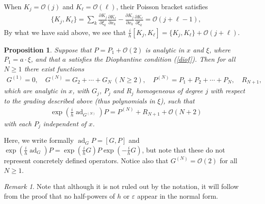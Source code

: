 \documentclass[12pt,lettersize]{article}
\renewcommand{\epsilon}{\varepsilon}
\newcommand{\poiss}[1]{\{#1\}}
\theoremstyle{plain}%
\newtheorem{prop}[theorem]{Proposition}
\numberwithin{theorem}{section}
\numberwithin{equation}{section}
\theoremstyle{definition}
\theoremstyle{remark}
\newtheorem{remark}[theorem]{Remark}
\DeclareMathOperator{\aad}{ad}
\begin{document}
{When $K_j = \mathcal{O}(j)$ and $K_\ell = \mathcal{O}(\ell)$, their Poisson bracket satisfies
%
\begin{align*}{}
\poiss{K_j,K_\ell} = \sum_{k} \frac{\partial K_j}{\partial \xi_k} \frac{\partial K_\ell}{\partial x_k}  - \frac{\partial K_j}{\partial x_k}\frac{\partial K_\ell}{\partial \xi_k} = \mathcal{O}(j + \ell - 1),
\end{align*}
%
By what we have said above, we see that $\frac{i}{h}[K_j,K_\ell] = \poiss{K_j,K_\ell} + \mathcal{O}(j + \ell)$. 


\begin{prop}\label{BNF}
Suppose  that $P = P_1 + \mathcal{O}(2)$ is analytic in $x$ and $\xi$, where $P_1 = a\cdot \xi$, and that $a$ satisfies the Diophantine condition (\ref{diof}). Then for all $N \geq 1$ there exist functions
%
\begin{align*}{}
G^{(1)} = 0,\quad G^{(N)} = G_2 + \cdots + G_N \ (N \geq 2), \quad P^{(N)} = P_1 + P_2 + \cdots + P_N, \quad  R_{N+1},
\end{align*}
%
which are analytic in $x$, with $G_j$, $P_j$ and $R_j$ homogeneous of degree $j$ with respect to the grading described above (thus polynomials in $\xi$), such that
%
\begin{align}\label{nth}
\textstyle  \exp\left( \frac{i}{h}\aad_{G^{(N)}}\right)P = P^{(N)} + R_{N+1} + \mathcal{O}(N+2)
\end{align}
%
with each $P_j$ independent of $x$. 
\end{prop}

Here, we write formally $\aad_G P = [G,P]$ and $\exp(\frac{i}{h}\aad_G) P = \exp(\frac{i}{h}G)P\exp(-\frac{i}{h}G)$, but note that these do not represent concretely defined operators. Notice also that $G^{(N)} = \mathcal{O}(2)$ for all $N \geq 1$. 

\begin{remark}
Note that although it is not ruled out by the notation, it will follow from the proof that no half-powers of $h$ or $\epsilon$ appear in the normal form. 
\end{remark}

}
\end{document}
